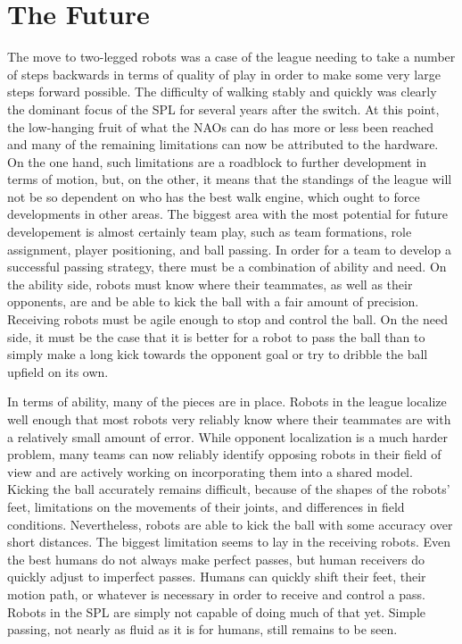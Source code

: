\documentclass{llncs}
\begin{document}
\section{The Future}

The move to two-legged robots was a case of the league needing to take a number
of steps backwards in terms of quality of play in order to make some very large
steps forward possible. The difficulty of walking stably and quickly was clearly the dominant
focus of the SPL for several years after the switch. At this point, the
low-hanging fruit of what the NAOs can do has more or less been reached and many of the
remaining limitations can now be attributed to the hardware. On the one hand, such limitations
are a roadblock to further development in terms of motion, but, on the other,
it means that the standings of the league will not be so dependent on who
has the best walk engine, which ought to force developments in other areas.
The biggest area with the most potential for future developement is almost certainly team play,
such as team formations, role assignment, player positioning, and ball passing. In order for a team to develop a successful passing strategy,
there must be a combination of ability and need. On the ability side, robots must
know where their teammates, as well as their opponents, are and be able to kick the ball with a fair amount
of precision. Receiving robots must be agile enough to stop and control the
ball. On the need side, it must be the case that it is better for a robot to pass
the ball than to simply make a long kick towards the opponent goal or try to dribble the ball
upfield on its own.

In terms of ability, many of the pieces are in place. Robots in the league localize
well enough that most robots very reliably know where their teammates are
with a relatively small amount of error. While opponent localization is a much
harder problem, many teams can now reliably identify opposing robots in their field
of view and are actively working on incorporating them into a shared model.
Kicking the ball accurately remains difficult,
because of the shapes of the robots' feet, limitations on the movements of their joints, and differences in field conditions. Nevertheless, robots are able to kick
the ball with some accuracy over short distances. The biggest limitation seems to
lay in the receiving robots. Even the best humans do not always make perfect passes,
but human receivers do quickly adjust to imperfect passes. Humans can quickly
shift their feet, their motion path, or whatever is necessary in order to receive and
control a pass. Robots in the SPL are simply not capable of doing much
of that yet. Simple passing, not  nearly as fluid as it
is for humans, still remains to be seen.%
\end{document}
